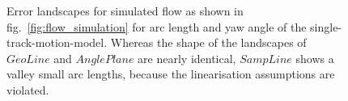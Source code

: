 \documentclass[a4paper]{article}
\begin{document}
\begin{figure}[htb]
\centering

\hfil
{}
\hfil
{}

\caption{Error landscapes for simulated flow as shown in fig.~\ref{fig:flow_simulation} for arc length and yaw angle of the single-track-motion-model. Whereas the shape of the landscapes of $GeoLine$ and $AnglePlane$ are nearly identical, $SampLine$ shows a valley small arc lengths, because the linearisation assumptions are violated.}
\label{fig:error_landscapes}
\end{figure}
\end{document}
